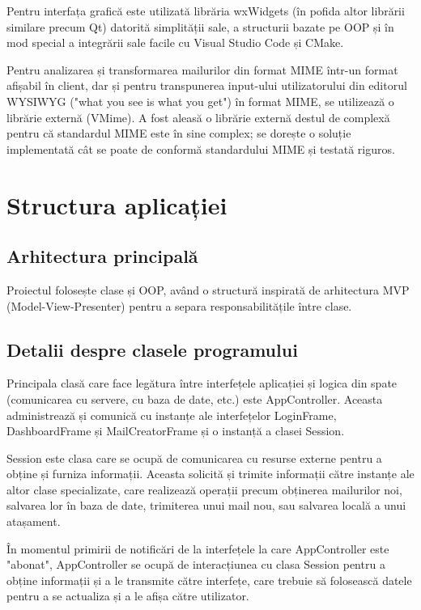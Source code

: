 \documentclass[runningheads]{llncs}
\begin{document}
Pentru interfața grafică este utilizată librăria wxWidgets (în pofida altor librării similare precum Qt) datorită simplității sale, a structurii bazate pe OOP și în mod special a integrării sale facile cu Visual Studio Code și CMake.

Pentru analizarea și transformarea mailurilor din format MIME\cite{ref_rfc_mime} într-un format afișabil în client, dar și pentru transpunerea input-ului utilizatorului din editorul WYSIWYG ("what you see is what you get") în format MIME, se utilizează o librărie externă (VMime). A fost aleasă o librărie externă destul de complexă pentru că standardul MIME este în sine complex; se dorește o soluție implementată cât se poate de conformă standardului MIME și testată riguros.



\section{Structura aplicației}


\subsection{Arhitectura principală}

Proiectul folosește clase și OOP, având o structură inspirată de arhitectura MVP (Model-View-Presenter) pentru a separa responsabilitățile între clase.



\subsection{Detalii despre clasele programului}


Principala clasă care face legătura între interfețele aplicației și logica din spate (comunicarea cu servere, cu baza de date, etc.) este AppController. Aceasta administrează și comunică cu instanțe ale interfețelor LoginFrame, DashboardFrame și MailCreatorFrame și o instanță a clasei Session.

Session este clasa care se ocupă de comunicarea cu resurse externe pentru a obține și furniza informații. Aceasta solicită și trimite informații către instanțe ale altor clase specializate, care realizează operații precum obținerea mailurilor noi, salvarea lor în baza de date, trimiterea unui mail nou, sau salvarea locală a unui atașament.

În momentul primirii de notificări de la interfețele la care AppController este "abonat", AppController se ocupă de interacțiunea cu clasa Session pentru a obține informații și a le transmite către interfețe, care trebuie să folosească datele pentru a se actualiza și a le afișa către utilizator.
\end{document}
